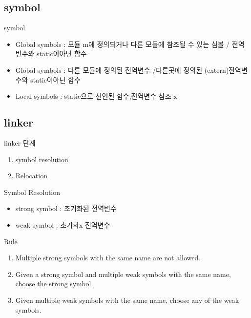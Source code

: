 \documentclass[10pt]{beamer}
\begin{document}
\subsection{symbol}
\begin{frame}{symbol}
    \begin{itemize}
        \item Global symbols : 모듈 m에 정의되거나 다른 모듈에 참조될 수 있는 심볼 / 전역변수와 static이아닌 함수
        \item Global symbols : 다른 모듈에 정의된 전역변수 
        /다른곳에 정의된 (extern)전역변수와 static이아닌 함수
        \item Local symbols : static으로 선언된 함수,전역변수 참조 x
    \end{itemize}
\end{frame}

\subsection{linker}
\begin{frame}{linker 단계}
    \begin{enumerate}
        \item symbol resolution
        \item Relocation
    \end{enumerate}
\end{frame}    


\begin{frame}{Symbol Resolution}
    \begin{itemize}
        \item strong symbol : 초기화된 전역변수
        \item weak symbol : 초기화x 전역변수
    \end{itemize}
    Rule
    \begin{enumerate}
        \item Multiple strong symbols with the same name are not allowed.
        \item Given a strong symbol and multiple weak symbols with the same name, choose the strong symbol.
        \item Given multiple weak symbols with the same name, choose any of the weak symbols.
    \end{enumerate}
\end{frame}    
\end{document}
